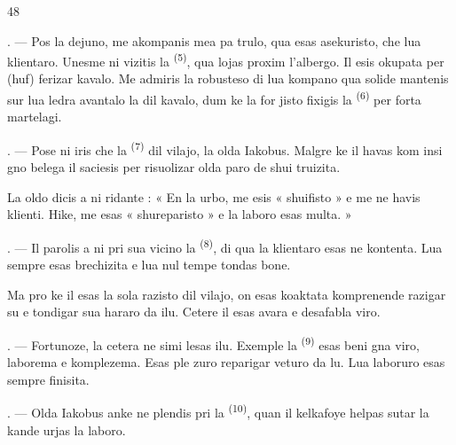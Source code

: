 \begin{VUpage}[50]{48}
\VUsaut{3.0mm}

. --- Pos la dejuno, me akompanis mea pa\cc
trulo, qua esas asekuristo, che lua klientaro.\nl
Unesme ni vizitis la  \textsuperscript{(5)}, qua lojas\nl
proxim l'albergo. Il esis okupata per (huf)\cc
ferizar kavalo. Me admiris la robusteso di lua\nl
kompano qua solide mantenis sur lua ledra\nl
avantalo la  dil kavalo, dum ke la for\cc
jisto fixigis la  \textsuperscript{(6)} per forta martelagi.

. --- Pose ni iris che la  \textsuperscript{(7)} dil vilajo,\nl
la olda Iakobus. Malgre ke il havas kom insi\cc
gno belega  il saciesis per risuolizar olda\nl
paro de shui truizita.

\VUblancAlinea
La oldo dicis a ni ridante : « En la urbo,\nl
me esis « shuifisto » e me ne havis klienti.\nl
Hike, me esas « shureparisto » e la laboro\nl
esas multa. »

. --- Il parolis a ni pri sua vicino la \cc
{} \textsuperscript{(8)}, di qua la klientaro esas ne kontenta. Lua\nl
{} sempre esas brechizita e lua  nul\cc
tempe tondas bone.

\VUblancAlinea
Ma pro ke il esas la sola razisto dil vilajo,\nl
on esas koaktata komprenende razigar su e\nl
tondigar sua hararo da ilu. Cetere il esas avara\nl
e desafabla viro.

. --- Fortunoze, la cetera  ne simi\cc
lesas ilu. Exemple la  \textsuperscript{(9)} esas beni\cc
gna viro, laborema e komplezema. Esas ple\cc
zuro reparigar veturo da lu. Lua laboruro esas\nl
sempre finisita.

. --- Olda Iakobus anke ne plendis pri la\nl
{} \textsuperscript{(10)}, quan il kelkafoye helpas sutar la\nl
{} kande urjas la laboro.
\end{VUpage}

